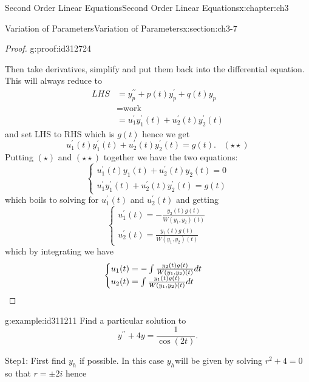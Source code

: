 \documentclass[oneside,10pt,]{book}
\newcommand{\qedhere}{\relax}
\numberwithin{equation}{section}
\numberwithin{equation}{section}
\newcommand{\amp}{&}
\begin{document}
\begin{chapterptx}{Second Order Linear Equations}{}{Second Order Linear Equations}{}{}{x:chapter:ch3}
\begin{sectionptx}{Variation of Parameters}{}{Variation of Parameters}{}{}{x:section:ch3-7}
\begin{proof}{}{g:proof:id312724}
\par
Then take derivatives, simplify and put them back into the differential equation. This will always reduce to%
\begin{align*}
LHS \amp =y_{p}^{\prime\prime}+p(t)y_{p}^{\prime}+q(t)y_{p}\\
\amp =\text{work}\\
\amp =u_{1}^{\prime}y_{1}^{\prime}(t)+u_{2}^{\prime}(t)y_{2}^{\prime}(t)
\end{align*}
and set LHS to RHS which is \(g(t)\) hence we get%
\begin{equation*}
u_{1}^{\prime}(t)y_{1}^{\prime}(t)+u_{2}^{\prime}(t)y_{2}^{\prime}(t)=g(t).\,\,\,\,\,(\star\star)
\end{equation*}
Putting \((\star)\) and \((\star\star)\) together we have the two equations:%
\begin{equation*}
\begin{cases}
u_{1}^{\prime}(t)y_{1}(t)+u_{2}^{\prime}(t)y_{2}(t)=0\\
u_{1}^{\prime}y_{1}^{\prime}(t)+u_{2}^{\prime}(t)y_{2}^{\prime}(t)=g(t)
\end{cases}
\end{equation*}
which boils to solving for \(u_{1}^{\prime}(t)\) and \(u_{2}^{\prime}(t)\) and getting%
\begin{equation*}
\begin{cases}
u_{1}^{\prime}(t)=-\frac{y_{2}(t)g(t)}{W\left(y_{1},y_{2}\right)(t)}\\
u_{2}^{\prime}(t)=\frac{y_{1}(t)g(t)}{W\left(y_{1},y_{2}\right)(t)}
\end{cases}
\end{equation*}
which by integrating we have%
\begin{equation*}
\begin{cases}
u_{1}(t)=-\int\frac{y_{2}(t)g(t)}{W\left(y_{1},y_{2}\right)(t)}dt\\
u_{2}(t)=\int\frac{y_{1}(t)g(t)}{W\left(y_{1},y_{2}\right)(t)}dt
\end{cases}\qedhere
\end{equation*}
%
\end{proof}
\begin{example}{}{g:example:id311211}%
Find a particular solution to%
\begin{equation*}
y^{\prime\prime}+4y=\frac{1}{\cos\left(2t\right)}.
\end{equation*}
%
\par
Step1: First find \(y_{h}\) if possible. In this case \(y_{h}\)will be given by solving \(r^{2}+4=0\) so that \(r=\pm2i\) hence%

\end{example}
\end{sectionptx}
\end{chapterptx}
\end{document}
